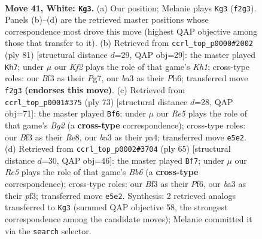 \documentclass[11pt]{article}
\begin{document}
\clearpage

\begin{figure}[p]\centering
\begin{subfigure}{0.46\textwidth}\centering
\resizebox{\linewidth}{!}{%
\newchessgame
\chessboard[
  setfen={8/pp4kp/6p1/4R3/5PPP/b4B2/3q1K2/8 w - - 5 41},
  showmover=false,
  pgfstyle=straightmove, color=movearrow, markmove={f2-g3}
]}
\caption{}
\end{subfigure}\hfill
\begin{subfigure}{0.46\textwidth}\centering
\resizebox{\linewidth}{!}{%
\newchessgame
\chessboard[
  setfen={2Q4k/6p1/7p/1p1nP3/1b6/7P/3r1PPK/8 b - - 6 41},
  showmover=false,
  pgfstyle=straightmove, color=movearrow, markmove={h8-h7}
]}
\caption{}
\end{subfigure}
\\[4pt]
\begin{subfigure}{0.46\textwidth}\centering
\resizebox{\linewidth}{!}{%
\newchessgame
\chessboard[
  setfen={4r3/5kb1/7p/5Qp1/P6P/8/1P3PPK/2r5 b - - 4 37},
  showmover=false,
  pgfstyle=straightmove, color=movearrow, markmove={g7-f6}
]}
\caption{}
\end{subfigure}\hfill
\begin{subfigure}{0.46\textwidth}\centering
\resizebox{\linewidth}{!}{%
\newchessgame
\chessboard[
  setfen={8/3Q2k1/3p1pp1/8/6P1/1b3P2/q4P2/5BK1 b - - 1 33},
  showmover=false,
  pgfstyle=straightmove, color=movearrow, markmove={b3-f7}
]}
\caption{}
\end{subfigure}
\caption{\textbf{Move 41, White: \texttt{Kg3}.} (a) Our position; Melanie plays \texttt{Kg3} (\texttt{f2g3}). Panels (b)--(d) are the retrieved master positions whose correspondence most drove this move (highest QAP objective among those that transfer to it). (b) Retrieved from \texttt{ccrl\_top\_p0000\#2002} (ply 81) [structural distance $d$=29, QAP obj=29]: the master played \texttt{Kh7}; under $\mu$ our \emph{Kf2} plays the role of that game's \emph{Kh1}; cross-type roles: our \emph{B}f3 as their \emph{P}g7, our \emph{b}a3 as their \emph{P}h6; transferred move \texttt{f2g3} \textbf{(endorses this move)}. (c) Retrieved from \texttt{ccrl\_top\_p0001\#375} (ply 73) [structural distance $d$=28, QAP obj=71]: the master played \texttt{Bf6}; under $\mu$ our \emph{Re5} plays the role of that game's \emph{Bg2} (a \textbf{cross-type} correspondence); cross-type roles: our \emph{B}f3 as their \emph{R}e8, our \emph{b}a3 as their \emph{p}a4; transferred move \texttt{e5e2}. (d) Retrieved from \texttt{ccrl\_top\_p0002\#3704} (ply 65) [structural distance $d$=30, QAP obj=46]: the master played \texttt{Bf7}; under $\mu$ our \emph{Re5} plays the role of that game's \emph{Bb6} (a \textbf{cross-type} correspondence); cross-type roles: our \emph{B}f3 as their \emph{P}f6, our \emph{b}a3 as their \emph{p}f3; transferred move \texttt{e5e2}. Synthesis: 2 retrieved analogs transferred to \texttt{Kg3} (summed QAP objective 58, the strongest correspondence among the candidate moves); Melanie committed it via the \texttt{search} selector.}
\label{fig:thought-m80}
\end{figure}
\end{document}
